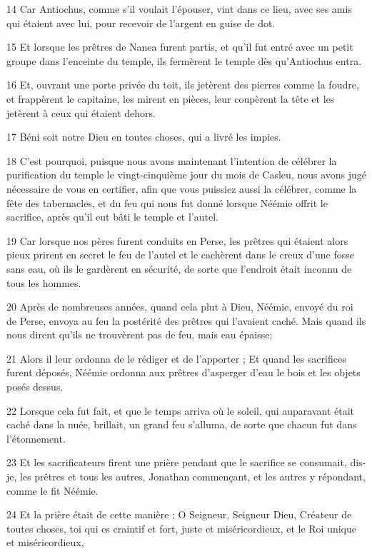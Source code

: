 \par 14 Car Antiochus, comme s'il voulait l'épouser, vint dans ce lieu, avec ses amis qui étaient avec lui, pour recevoir de l'argent en guise de dot.
\par 15 Et lorsque les prêtres de Nanea furent partis, et qu'il fut entré avec un petit groupe dans l'enceinte du temple, ils fermèrent le temple dès qu'Antiochus entra.
\par 16 Et, ouvrant une porte privée du toit, ils jetèrent des pierres comme la foudre, et frappèrent le capitaine, les mirent en pièces, leur coupèrent la tête et les jetèrent à ceux qui étaient dehors.
\par 17 Béni soit notre Dieu en toutes choses, qui a livré les impies.
\par 18 C'est pourquoi, puisque nous avons maintenant l'intention de célébrer la purification du temple le vingt-cinquième jour du mois de Casleu, nous avons jugé nécessaire de vous en certifier, afin que vous puissiez aussi la célébrer, comme la fête des tabernacles, et du feu qui nous fut donné lorsque Néémie offrit le sacrifice, après qu'il eut bâti le temple et l'autel.
\par 19 Car lorsque nos pères furent conduits en Perse, les prêtres qui étaient alors pieux prirent en secret le feu de l'autel et le cachèrent dans le creux d'une fosse sans eau, où ils le gardèrent en sécurité, de sorte que l'endroit était inconnu de tous les hommes.
\par 20 Après de nombreuses années, quand cela plut à Dieu, Néémie, envoyé du roi de Perse, envoya au feu la postérité des prêtres qui l'avaient caché. Mais quand ils nous dirent qu'ils ne trouvèrent pas de feu, mais eau épaisse;
\par 21 Alors il leur ordonna de le rédiger et de l'apporter ; Et quand les sacrifices furent déposés, Néémie ordonna aux prêtres d'asperger d'eau le bois et les objets posés dessus.
\par 22 Lorsque cela fut fait, et que le temps arriva où le soleil, qui auparavant était caché dans la nuée, brillait, un grand feu s'alluma, de sorte que chacun fut dans l'étonnement.
\par 23 Et les sacrificateurs firent une prière pendant que le sacrifice se consumait, dis-je, les prêtres et tous les autres, Jonathan commençant, et les autres y répondant, comme le fit Néémie.
\par 24 Et la prière était de cette manière ; O Seigneur, Seigneur Dieu, Créateur de toutes choses, toi qui es craintif et fort, juste et miséricordieux, et le Roi unique et miséricordieux,

